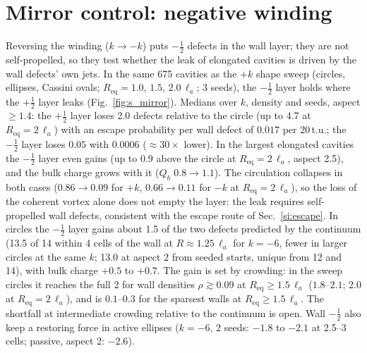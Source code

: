 \documentclass[aps,prl,onecolumn,superscriptaddress,amsmath,amssymb,nofootinbib]{revtex4-2}
\newcommand{\half}{\tfrac12}
\newcommand{\la}{\ell_a}
\begin{document}
\section{Mirror control: negative winding}\label{si:mirror}
Reversing the winding ($k\to-k$) puts $-\half$ defects in the wall layer; they are not self-propelled, so they test whether the leak of elongated cavities is
driven by the wall defects' own jets.
In the same 675 cavities as the $+k$ shape sweep (circles, ellipses, Cassini ovals; $R_\mathrm{eq}=1.0$, $1.5$, $2.0\,\la$; 3 seeds), the $-\half$ layer
holds where the $+\half$ layer leaks (Fig.~\ref{fig:s_mirror}). Medians over $k$, density and seeds, aspect $\geq1.4$: the $+\half$ layer loses 2.0 defects relative
to the circle (up to 4.7 at $R_\mathrm{eq}=2\,\la$) with an escape probability per wall defect of $0.017$ per 20\,t.u.; the $-\half$ layer loses $0.05$ with
$0.0006$ ($\approx30\times$ lower). In the largest elongated cavities the $-\half$ layer even gains (up to $0.9$ above the circle at $R_\mathrm{eq}=2\,\la$, aspect
2.5), and the bulk charge grows with it ($Q_b$ $0.8\to1.1$). The circulation collapses in both cases ($0.86\to0.09$ for $+k$, $0.66\to0.11$ for $-k$ at
$R_\mathrm{eq}=2\,\la$), so the loss of the coherent vortex alone does not empty the layer: the leak requires self-propelled wall defects, consistent with the
escape route of Sec.~\ref{si:escape}. In circles the $-\half$ layer gains about 1.5 of the two defects predicted by the continuum (13.5 of 14 within 4 cells of the wall
at $R\approx1.25\,\la$ for $k=-6$, fewer in larger circles at the same $k$; 13.0 at aspect 2 from seeded starts, unique from 12 and 14), with bulk charge $+0.5$ to $+0.7$.
The gain is set by crowding: in the sweep circles it reaches the full 2 for wall densities $\rho\gtrsim0.09$ at $R_\mathrm{eq}\geq1.5\,\la$ ($1.8$--$2.1$; 2.0 at $R_\mathrm{eq}=2\,\la$), and is
$0.1$--$0.3$ for the sparsest walls at $R_\mathrm{eq}\geq1.5\,\la$. The shortfall at intermediate crowding relative to the continuum is open. Wall $-\half$ also keep a restoring force in active ellipses ($k=-6$, 2 seeds: $-1.8$ to $-2.1$ at 2.5--3 cells; passive, aspect 2: $-2.6$).
\end{document}
